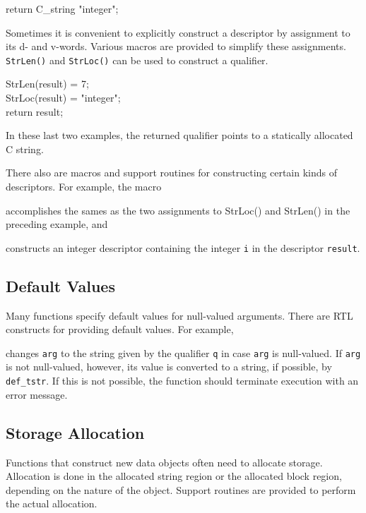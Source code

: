\begin{iconcode}
return C\_string "integer";
\end{iconcode}

Sometimes it is convenient to explicitly construct a descriptor by
assignment to its d- and v-words. Various macros are provided to
simplify these assignments.  \texttt{StrLen()} and \texttt{StrLoc()} can
be used to construct a qualifier.
\goodbreak
\begin{iconcode}
StrLen(result) = 7;\\
StrLoc(result) = "integer";\\
return result;
\end{iconcode}
\noindent
In these last two examples, the returned qualifier points to a
statically allocated C string.

There also are macros and support routines for constructing certain
kinds of descriptors. For example, the macro


accomplishes the sames as the two assignments to StrLoc() and StrLen()
in the preceding example, and


\noindent
constructs an integer descriptor containing the integer \texttt{i} in the
descriptor \texttt{result}.


\subsection{Default Values}

Many functions specify default values for null-valued arguments. There
are RTL constructs for providing default values. For example,



\noindent
changes \texttt{arg} to the string given by the qualifier \texttt{q} in
case \texttt{arg} is null-valued. If \texttt{arg} is not null-valued,
however, its value is converted to a string, if possible, by
\texttt{def\_tstr}. If this is not possible, the function should terminate
execution with an error message.

\subsection{Storage Allocation}

Functions that construct new data objects often need to allocate
storage. Allocation is done in the allocated string region or the
allocated block region, depending on the nature of the object. Support
routines are provided to perform the actual allocation.

